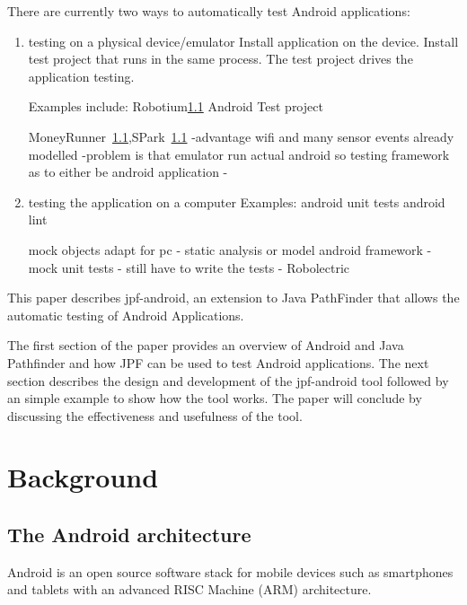 \documentclass{acm_proc_article-sp}
\begin{document}
There are currently two ways to automatically test Android applications:
\begin{enumerate}
 \item testing on a physical device/emulator
  Install application on the device. Install test project that runs in the same process. The test project drives the application testing. 
 

 
  Examples include: Robotium\ref{} Android Test project

  MoneyRunner~\ref{},SPark~\ref{}
  -advantage wifi and many sensor events  already modelled
-problem is that emulator run actual android so testing framework as to either be android application
-
 
 \item testing the application on a computer
   Examples:
    android unit tests
    android lint
    
   mock objects
   adapt for pc
- static analysis or model android framework
- mock unit tests - still have to write the tests
- Robolectric
\end{enumerate}
 

This paper describes jpf-android, an extension to Java PathFinder that allows the automatic testing of Android Applications. 

The first section of the paper provides an overview of Android and Java Pathfinder and how JPF can be used to test Android applications.
The next section describes the design and development of the jpf-android tool followed by an simple example to show how the tool works. The
paper will conclude by discussing the effectiveness and usefulness of the tool.








\newpage
\section{Background}
\subsection{The Android architecture}
Android is an open source software stack for mobile devices such as smartphones and tablets with an advanced RISC Machine (ARM)
architecture.
\end{document}
